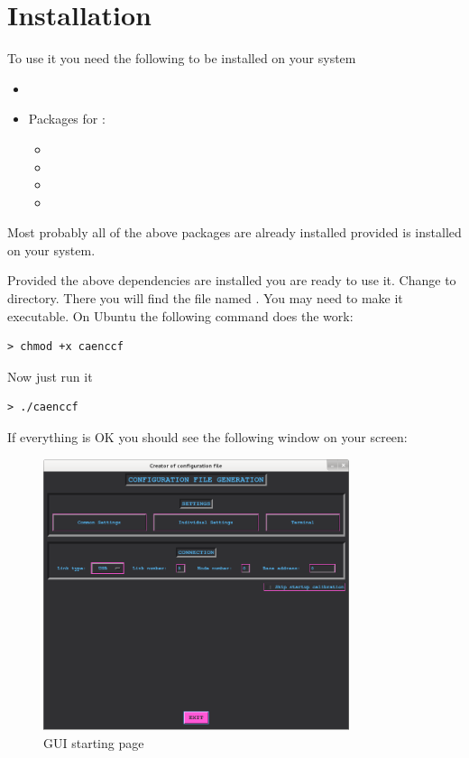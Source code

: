 \section{Installation}
To use it you need the following to be installed on your system
\begin{itemize}
    \item {}
    \item Packages for :
            \begin{itemize}
                \item {}
                \item {}
                \item {}
                \item {}
            \end{itemize}
\end{itemize} 
Most probably all of the above packages are already installed provided 
is installed on your system.

Provided the above dependencies are installed you are ready to use it. Change to
 directory. There you will find the file named . You may need
to make it executable. On Ubuntu the following command does the work:
\begin{lstlisting}
> chmod +x caenccf
\end{lstlisting}
Now just run it
\begin{lstlisting}
> ./caenccf
\end{lstlisting}
If everything is OK you should see the following window on your screen:
\begin{figure}[H]
    \centering
    \includegraphics[width=0.8\textwidth]{../pictures/documentation/gui/start_page.png}
    \caption{GUI starting page}
    \label{fig:gui_stpg}
\end{figure}

